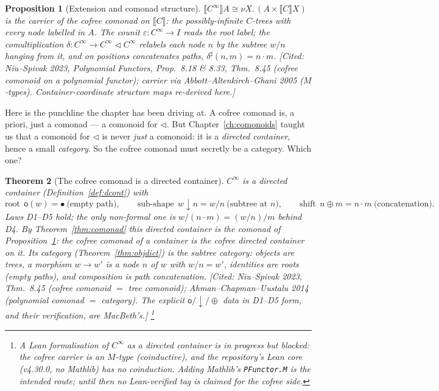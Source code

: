 \documentclass[11pt,a4paper]{book}
\newcommand{\Ext}[1]{\llbracket #1 \rrbracket}
\theoremstyle{plain}
\newtheorem{Theorem}{Theorem}[chapter]
\newtheorem{Proposition}[Theorem]{Proposition}
\theoremstyle{definition}
\theoremstyle{remark}
\newcommand{\prov}[1]{\hfill\textsf{\footnotesize[#1]}}
\begin{document}
\begin{Proposition}[Extension and comonad structure]\label{prop:cofree-ext}
$\Ext{C^{\infty}}A\cong\nu X.\,(A\times\Ext C X)$ is the carrier of the cofree comonad on
$\Ext C$: the possibly-infinite $C$-trees with \emph{every node} labelled in $A$. The counit
$\varepsilon\colon C^{\infty}\to I$ reads the root label; the comultiplication
$\delta\colon C^{\infty}\to C^{\infty}\triangleleft C^{\infty}$ relabels each node $n$ by the
subtree $w/n$ hanging from it, and on positions concatenates paths, $\delta^{\sharp}(n,m)=n\cdot
m$.
\prov{Cited: Niu--Spivak 2023, \emph{Polynomial Functors}, Prop.\ 8.18 \& 8.33, Thm.\ 8.45
(cofree comonoid on a polynomial functor); carrier via Abbott--Altenkirch--Ghani 2005
($M$-types). Container-coordinate structure maps re-derived here.}
\end{Proposition}

Here is the punchline the chapter has been driving at. A cofree comonad is, a priori, just a
comonad --- a comonoid for $\triangleleft$. But Chapter~\ref{ch:comonoids} taught us that a
comonoid for $\triangleleft$ is never \emph{just} a comonoid: it is a \emph{directed
container}, hence a small \emph{category}. So the cofree comonad must secretly be a category.
Which one?

\begin{Theorem}[The cofree comonad is a directed container]\label{thm:cofree-dircont}
$C^{\infty}$ is a directed container (Definition~\ref{def:dcont}) with
\[
  \text{root}\ \ \mathsf o(w)=\bullet\ \text{(empty path)},\qquad
  \text{sub-shape}\ \ w\downarrow n=w/n\ \text{(subtree at $n$)},\qquad
  \text{shift}\ \ n\oplus m=n\cdot m\ \text{(concatenation)}.
\]
Laws \textup{D1--D5} hold; the only non-formal one is $w/(n\cdot m)=(w/n)/m$ behind
\textup{D4}. By Theorem~\ref{thm:comonad} this directed container \emph{is} the comonad of
Proposition~\ref{prop:cofree-ext}: the cofree comonad of a container is the cofree
\emph{directed} container on it. Its category (Theorem~\ref{thm:objdict}) is the
\emph{subtree category}: objects are trees, a morphism $w\to w'$ is a node $n$ of $w$ with
$w/n=w'$, identities are roots (empty paths), and composition is path concatenation.
\prov{Cited: Niu--Spivak 2023, Thm.\ 8.45 (cofree comonoid $=$ tree comonoid);
Ahman--Chapman--Uustalu 2014 (polynomial comonad $=$ category). The explicit
$\mathsf o/\!\downarrow\!/\oplus$ data in D1--D5 form, and their verification, are MacBeth's.}%
\footnote{A Lean formalisation of $C^{\infty}$ as a directed container is \emph{in progress}
but blocked: the cofree carrier is an $M$-type (coinductive), and the repository's Lean core
(v4.30.0, no Mathlib) has no coinduction. Adding Mathlib's \texttt{PFunctor.M} is the intended
route; until then no \textsf{Lean-verified} tag is claimed for the cofree side.}
\end{Theorem}
\end{document}
